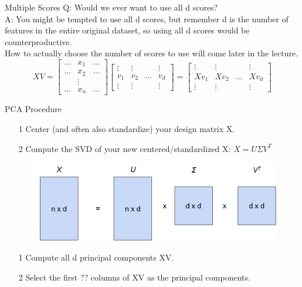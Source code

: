 \documentclass[aspectratio=169]{../latex_main/tntbeamer}  %
\begin{document}
	
	\begin{frame}{Multiple Scores}
	    Q: Would we ever want to use all d scores?\\
	    A: You might be tempted to use all d scores, but remember d is the number of features in the entire original dataset, so using all d scores would be counterproductive.\\
	    How to actually choose the number of scores to use will come later in the lecture.
	    \begin{equation*}
	        XV = \left[\begin{array}{ccc}
	           \dots  &  x_1 & \dots \\
	           \dots  &  x_2 & \dots \\
	                  & \vdots & \\
	           \dots  & x_n  & \dots       
	        \end{array}\right]
	        \left[\begin{array}{cccc}
	           \vdots  &  \vdots &  &  \vdots \\
	           v_1     &  v_2    & \dots &  v_d \\
	           \vdots  & \vdots  &    & \vdots   
	        \end{array}\right] = \left[\begin{array}{cccc}
	           \vdots  &  \vdots &  &  \vdots \\
	           Xv_1     &  Xv_2    & \dots &  Xv_d \\
	           \vdots  & \vdots  &    & \vdots   
	        \end{array}\right]
	    \end{equation*}
	\end{frame}
	
	
	
	\begin{frame}{PCA Procedure}
	    \begin{itemize}
	        \item[1]  Center (and often also standardize) your design matrix X.
	        \item[2] Compute the SVD of your new centered/standardized X: $X = U\Sigma V^T$
	    \end{itemize}
	    \begin{figure}
	        \centering
	        \includegraphics[scale=.5]{Bild12}
	    \end{figure}
	     \begin{itemize}
	        \item[1]  Compute all d principal components XV.
	        \item[2] Select the first ?? columns of XV as the principal components.
	    \end{itemize}
	\end{frame}
	
\end{document}
